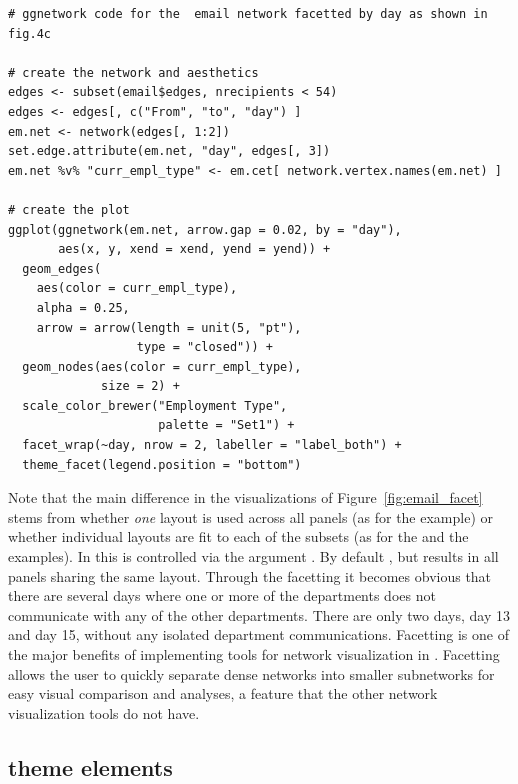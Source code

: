 \begin{knitrout}
\color{fgcolor}\begin{kframe}
\begin{verbatim}
# ggnetwork code for the  email network facetted by day as shown in fig.4c

# create the network and aesthetics
edges <- subset(email$edges, nrecipients < 54)
edges <- edges[, c("From", "to", "day") ]
em.net <- network(edges[, 1:2])
set.edge.attribute(em.net, "day", edges[, 3])
em.net %v% "curr_empl_type" <- em.cet[ network.vertex.names(em.net) ]

# create the plot
ggplot(ggnetwork(em.net, arrow.gap = 0.02, by = "day"),
       aes(x, y, xend = xend, yend = yend)) +
  geom_edges(
    aes(color = curr_empl_type),
    alpha = 0.25,
    arrow = arrow(length = unit(5, "pt"),
                  type = "closed")) +
  geom_nodes(aes(color = curr_empl_type),
             size = 2) +
  scale_color_brewer("Employment Type",
                     palette = "Set1") +
  facet_wrap(~day, nrow = 2, labeller = "label_both") +
  theme_facet(legend.position = "bottom")
\end{verbatim}
\end{kframe}
\end{knitrout}

Note that the main difference in the visualizations of Figure~\ref{fig:email_facet} stems from whether \emph{one} layout is used across all panels (as for the  example) or whether individual layouts are fit to each of the subsets (as for the  and the  examples). In  this is controlled via the argument . By default  , but  results in all panels sharing the same layout. Through the facetting it becomes obvious that there are several days where one or more of the departments does not communicate with any of the other departments. There are only two days, day 13 and day 15, without any isolated department communications. Facetting is one of the major benefits of implementing tools for network visualization in . Facetting allows the user to quickly separate dense networks into smaller subnetworks for easy visual comparison and analyses, a feature that the other network visualization tools do not have.

\subsection{ theme elements} %

